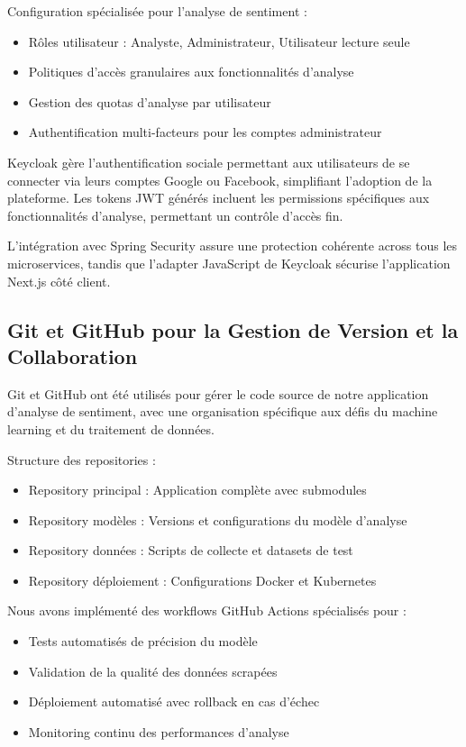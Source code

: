 Configuration spécialisée pour l'analyse de sentiment :
\begin{itemize}
    \item Rôles utilisateur : Analyste, Administrateur, Utilisateur lecture seule
    \item Politiques d'accès granulaires aux fonctionnalités d'analyse
    \item Gestion des quotas d'analyse par utilisateur
    \item Authentification multi-facteurs pour les comptes administrateur
\end{itemize}

Keycloak gère l'authentification sociale permettant aux utilisateurs de se connecter via leurs comptes Google ou Facebook, simplifiant l'adoption de la plateforme. Les tokens JWT générés incluent les permissions spécifiques aux fonctionnalités d'analyse, permettant un contrôle d'accès fin.

L'intégration avec Spring Security assure une protection cohérente across tous les microservices, tandis que l'adapter JavaScript de Keycloak sécurise l'application Next.js côté client.

\subsection{Git et GitHub pour la Gestion de Version et la Collaboration}
Git et GitHub ont été utilisés pour gérer le code source de notre application d'analyse de sentiment, avec une organisation spécifique aux défis du machine learning et du traitement de données.

Structure des repositories :
\begin{itemize}
    \item Repository principal : Application complète avec submodules
    \item Repository modèles : Versions et configurations du modèle d'analyse
    \item Repository données : Scripts de collecte et datasets de test
    \item Repository déploiement : Configurations Docker et Kubernetes
\end{itemize}

Nous avons implémenté des workflows GitHub Actions spécialisés pour :
\begin{itemize}
    \item Tests automatisés de précision du modèle
    \item Validation de la qualité des données scrapées
    \item Déploiement automatisé avec rollback en cas d'échec
    \item Monitoring continu des performances d'analyse
\end{itemize}


